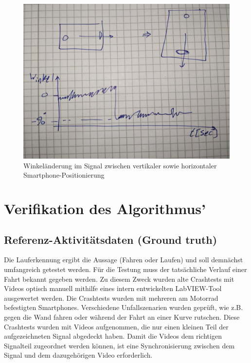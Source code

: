 \begin{figure}[H]
	\centering
	\includegraphics[width=\linewidth]{Bilder/SignalHorizontalUndVertikal.jpg}
	\caption{Winkeländerung im Signal zwischen vertikaler sowie horizontaler Smartphone-Positionierung}
	\label{fig:SignalHorizontalUndVertikal}
\end{figure}



\section{Verifikation des Algorithmus'}
%
%
%


\subsection{Referenz-Aktivitätsdaten (Ground truth)}

Die Lauferkennung ergibt die Aussage (Fahren oder Laufen) und soll demnächst umfangreich getestet werden. Für die Testung muss der tatsächliche Verlauf einer Fahrt bekannt gegeben werden. Zu diesem Zweck wurden alte Crashtests mit Videos optisch manuell mithilfe eines intern entwickelten LabVIEW-Tool ausgewertet werden. Die Crashtests wurden mit mehreren am Motorrad befestigten Smartphones. Verschiedene Unfallszenarien wurden geprüft, wie z.B. gegen die Wand fahren oder während der Fahrt an einer Kurve rutschen. Diese Crashtests wurden mit Videos aufgenommen, die nur einen kleinen Teil der aufgezeichneten Signal abgedeckt haben. Damit die Videos dem richtigen Signalteil zugeordnet werden können, ist eine Synchronisierung zwischen dem Signal und dem dazugehörigen Video erforderlich. 

